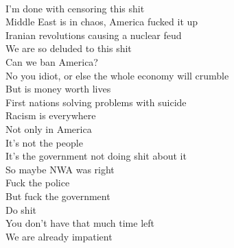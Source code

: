 \documentclass[12pt, b5paper]{article}
\begin{document}
\\I'm done with censoring this shit
\\Middle East is in chaos, America fucked it up
\\Iranian revolutions causing a nuclear feud
\\We are so deluded to this shit
\\Can we ban America?
\\No you idiot, or else the whole economy will crumble
\\But is money worth lives
\\First nations solving problems with suicide
\\Racism is everywhere
\\Not only in America
\\It's not the people
\\It's the government not doing shit about it
\\So maybe NWA was right
\\Fuck the police
\\But fuck the government
\\Do shit
\\You don't have that much time left
\\We are already impatient  

\newpage 
\end{document}
